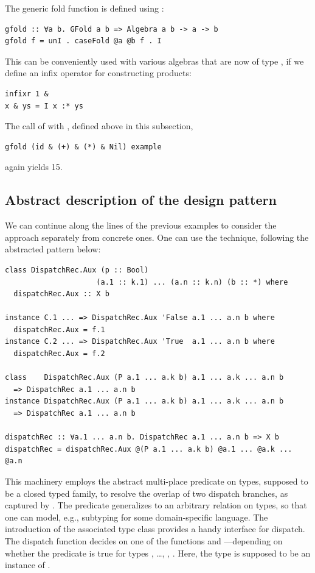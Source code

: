 \documentclass[sigplan,screen,review,anonymous]{acmart}
\begin{document}
The generic fold function  is defined using :
\begin{lstlisting}[style=fancy]
gfold :: ∀a b. GFold a b => Algebra a b -> a -> b
gfold f = unI . caseFold @a @b f . I
\end{lstlisting}

This can be conveniently used with various algebras that are now of type , if we define an infix operator \K{&} for constructing products:
\begin{lstlisting}[style=fancy]
infixr 1 &
x & ys = I x :* ys
\end{lstlisting}
The call of  with , defined above in this subsection,
\begin{lstlisting}[style=fancy]
gfold (id & (+) & (*) & Nil) example
\end{lstlisting}
again yields 15.

\subsection{Abstract description of the design pattern}
\label{subsec:abstract-pattern}


We can continue along the lines of the previous examples to consider the approach separately from concrete ones. One can use the technique, following the abstracted pattern below:

\begin{lstlisting}[style=fancy]
class DispatchRec.Aux (p :: Bool)
                     (a.1 :: k.1) ... (a.n :: k.n) (b :: *) where
  dispatchRec.Aux :: X b

instance C.1 ... => DispatchRec.Aux 'False a.1 ... a.n b where
  dispatchRec.Aux = f.1
instance C.2 ... => DispatchRec.Aux 'True  a.1 ... a.n b where
  dispatchRec.Aux = f.2

class    DispatchRec.Aux (P a.1 ... a.k b) a.1 ... a.k ... a.n b
  => DispatchRec a.1 ... a.n b
instance DispatchRec.Aux (P a.1 ... a.k b) a.1 ... a.k ... a.n b
  => DispatchRec a.1 ... a.n b

dispatchRec :: ∀a.1 ... a.n b. DispatchRec a.1 ... a.n b => X b
dispatchRec = dispatchRec.Aux @(P a.1 ... a.k b) @a.1 ... @a.k ... @a.n
\end{lstlisting}

This machinery employs the abstract multi-place predicate  on types, supposed to be a closed typed family, to resolve the overlap of two dispatch branches, as captured by . The predicate  generalizes  to an arbitrary relation on types, so that one can model, e.g., subtyping for some domain-specific language. The introduction of the associated type class  provides a handy interface for dispatch. The dispatch function  decides on one of the functions  and ---depending on whether the predicate  is true for types , \dots, , . Here, the type  is supposed to be an instance of .
\end{document}
